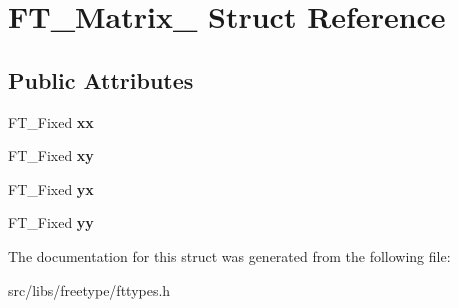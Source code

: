 \hypertarget{struct_f_t___matrix__}{
\section{FT\_\-Matrix\_\- Struct Reference}
\label{struct_f_t___matrix__}
}
\subsection*{Public Attributes}
\begin{DoxyCompactItemize}
\item 
\hypertarget{struct_f_t___matrix___a27d51c2958634abe7bf377610e095f74}{
FT\_\-Fixed {\bfseries xx}}
\label{struct_f_t___matrix___a27d51c2958634abe7bf377610e095f74}

\item 
\hypertarget{struct_f_t___matrix___a7e9f439d37c00ba1a11919bcaa8937a2}{
FT\_\-Fixed {\bfseries xy}}
\label{struct_f_t___matrix___a7e9f439d37c00ba1a11919bcaa8937a2}

\item 
\hypertarget{struct_f_t___matrix___a55792583a843a1611b43c40534a02a17}{
FT\_\-Fixed {\bfseries yx}}
\label{struct_f_t___matrix___a55792583a843a1611b43c40534a02a17}

\item 
\hypertarget{struct_f_t___matrix___a689a6fd20a88238788b90c3597ee0c2a}{
FT\_\-Fixed {\bfseries yy}}
\label{struct_f_t___matrix___a689a6fd20a88238788b90c3597ee0c2a}

\end{DoxyCompactItemize}


The documentation for this struct was generated from the following file:\begin{DoxyCompactItemize}
\item 
src/libs/freetype/fttypes.h\end{DoxyCompactItemize}

